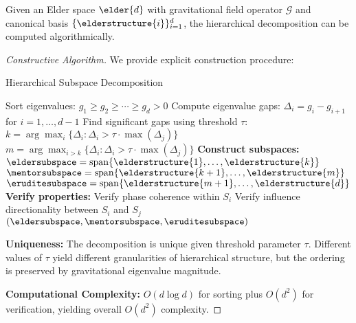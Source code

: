 \begin{theorem}
\label{thm:hierarchical_decomposition_algorithm}
Given an Elder space $\elder{d}$ with gravitational field operator $\mathcal{G}$ and canonical basis $\{\elderstructure{i}\}_{i=1}^{d}$, the hierarchical decomposition can be computed algorithmically.
\end{theorem}

\begin{proof}[Constructive Algorithm]
We provide explicit construction procedure:

\begin{algorithm}[H]
\caption{Hierarchical Subspace Decomposition}
\begin{algorithmic}[1]
    \State Sort eigenvalues: $g_1 \geq g_2 \geq \cdots \geq g_d > 0$
    \State Compute eigenvalue gaps: $\Delta_i = g_i - g_{i+1}$ for $i = 1, \ldots, d-1$
    \State Find significant gaps using threshold $\tau$:
    \State $k = \arg\max_{i} \{\Delta_i : \Delta_i > \tau \cdot \max(\Delta_j)\}$
    \State $m = \arg\max_{i>k} \{\Delta_i : \Delta_i > \tau \cdot \max(\Delta_j)\}$
    \State \textbf{Construct subspaces:}
    \State $\eldersubspace = \mathrm{span}\{\elderstructure{1}, \ldots, \elderstructure{k}\}$
    \State $\mentorsubspace = \mathrm{span}\{\elderstructure{k+1}, \ldots, \elderstructure{m}\}$
    \State $\eruditesubspace = \mathrm{span}\{\elderstructure{m+1}, \ldots, \elderstructure{d}\}$
    \State \textbf{Verify properties:}
        \State Verify phase coherence within $S_i$
        \State Verify influence directionality between $S_i$ and $S_j$
    \EndFor
    \State \Return $(\eldersubspace, \mentorsubspace, \eruditesubspace)$
\EndProcedure
\end{algorithmic}
\end{algorithm}

\textbf{Uniqueness:} The decomposition is unique given threshold parameter $\tau$. Different values of $\tau$ yield different granularities of hierarchical structure, but the ordering is preserved by gravitational eigenvalue magnitude.

\textbf{Computational Complexity:} $O(d \log d)$ for sorting plus $O(d^2)$ for verification, yielding overall $O(d^2)$ complexity.


\end{proof}
